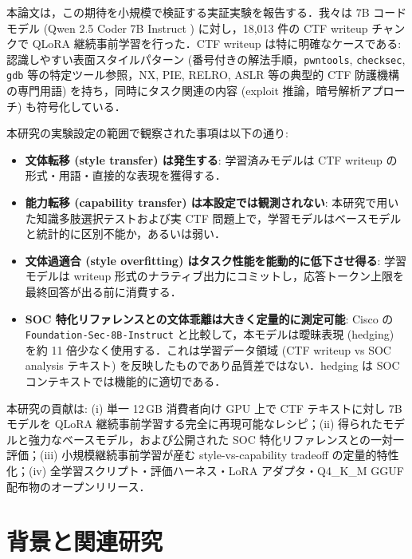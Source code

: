 \documentclass[10pt,twocolumn,a4paper]{ltjsarticle}
\begin{document}
本論文は，この期待を小規模で検証する実証実験を報告する．我々は 7B コードモデル (Qwen 2.5 Coder 7B Instruct \cite{hui2024qwen25coder}) に対し，18{,}013 件の CTF writeup チャンクで QLoRA \cite{dettmers2023qlora} 継続事前学習を行った．CTF writeup は特に明確なケースである: 認識しやすい表面スタイルパターン (番号付きの解法手順，\texttt{pwntools}, \texttt{checksec}, \texttt{gdb} 等の特定ツール参照，NX, PIE, RELRO, ASLR 等の典型的 CTF 防護機構の専門用語) を持ち，同時にタスク関連の内容 (exploit 推論，暗号解析アプローチ) も符号化している．

本研究の実験設定の範囲で観察された事項は以下の通り:

\begin{itemize}
\item \textbf{文体転移 (style transfer) は発生する}: 学習済みモデルは CTF writeup の形式・用語・直接的な表現を獲得する．
\item \textbf{能力転移 (capability transfer) は本設定では観測されない}: 本研究で用いた知識多肢選択テストおよび実 CTF 問題上で，学習モデルはベースモデルと統計的に区別不能か，あるいは弱い．
\item \textbf{文体過適合 (style overfitting) はタスク性能を能動的に低下させ得る}: 学習モデルは writeup 形式のナラティブ出力にコミットし，応答トークン上限を最終回答が出る前に消費する．
\item \textbf{SOC 特化リファレンスとの文体乖離は大きく定量的に測定可能}: Cisco の \texttt{Foundation-Sec-8B-Instruct} \cite{cisco2025foundationsec} と比較して，本モデルは曖昧表現 (hedging) を約 11 倍少なく使用する．これは学習データ領域 (CTF writeup vs SOC analysis テキスト) を反映したものであり品質差ではない．hedging は SOC コンテキストでは機能的に適切である．
\end{itemize}

本研究の貢献は: (i) 単一 12\,GB 消費者向け GPU 上で CTF テキストに対し 7B モデルを QLoRA 継続事前学習する完全に再現可能なレシピ；(ii) 得られたモデルと強力なベースモデル，および公開された SOC 特化リファレンスとの一対一評価；(iii) 小規模継続事前学習が産む style-vs-capability tradeoff の定量的特性化；(iv) 全学習スクリプト・評価ハーネス・LoRA アダプタ・Q4{\_}K{\_}M GGUF 配布物のオープンリリース．

\section{背景と関連研究}
\end{document}
